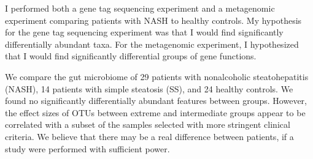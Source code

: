 I performed both a gene tag sequencing experiment and a metagenomic experiment comparing patients with NASH to healthy controls. My hypothesis for the gene tag sequencing experiment was that I would find significantly differentially abundant taxa. For the metagenomic experiment, I hypothesized that I would find significantly differential groups of gene functions.

We compare the gut microbiome of 29 patients with nonalcoholic steatohepatitis (NASH), 14 patients with simple steatosis (SS), and 24 healthy controls. We found no significantly differentially abundant features between groups. However, the effect sizes of OTUs between extreme and intermediate groups appear to be correlated with a subset of the samples selected with more stringent clinical criteria. We believe that there may be a real difference between patients, if a study were performed with sufficient power.